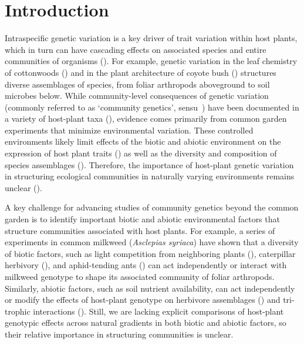\documentclass[11pt]{article}
\begin{document}
\newpage{}

\section*{Introduction}


Intraspecific genetic variation is a key driver of trait variation
within host plants, which in turn can have cascading effects on
associated species and entire communities of organisms
(\citealt{Fritz_1988, Lamit_2016, Maddox_1990, antonovics1992toward}). For
example, genetic variation in the leaf chemistry of cottonwoods
(\citealt{Whitham_2006}) and in the plant architecture of coyote bush
(\citealt{Crutsinger_2014}) structures diverse assemblages of species, from foliar
arthropods aboveground to soil microbes below. While community-level
consequences of genetic variation (commonly referred to as `community
genetics', sensu~\citealt{antonovics1992toward}) have been documented in a variety of
host-plant taxa (\citealt{Whitham_2012}), evidence comes primarily from common
garden experiments that minimize environmental variation. These
controlled environments likely limit effects of the biotic and abiotic
environment on the expression of host plant traits (\citealt{Gratani_2014}) as
well as the diversity and composition of species assemblages
(\citep{macarthur1972geographical, Gaston_2000}). Therefore, the importance of
host-plant genetic variation in structuring ecological communities in
naturally varying environments remains unclear
(\citealt{Hersch_Green_2011, Tack_2011, Crutsinger_2015}).

A key challenge for advancing studies of community genetics beyond the
common garden is to identify important biotic and abiotic environmental
factors that structure communities associated with host plants. For
example, a series of experiments in common milkweed (\emph{Asclepias
syriaca}) have shown that a diversity of biotic factors, such as light
competition from neighboring plants (\citealt{Agrawal_2003}), caterpillar
herbivory (\citealt{Abdala_Roberts_2012}), and aphid-tending
ants (\citealt{Mooney_2008, Abdala_Roberts_2012}) can act independently or interact
with milkweed genotype to shape its associated community of foliar
arthropods. Similarly, abiotic factors, such as soil nutrient
availability, can act independently or modify the effects of host-plant
genotype on herbivore assemblages (\citealt{Orians_1996}) and tri-trophic
interactions (\citealt{Rossi_1998, Abdala_Roberts_2012a}). Still, we are lacking
explicit comparisons of host-plant genotypic effects across natural
gradients in both biotic and abiotic factors, so their relative
importance in structuring communities is unclear.
\end{document}
